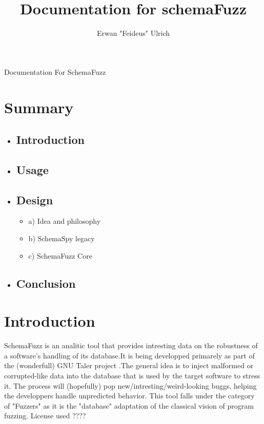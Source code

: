 \documentclass{article}
\title{Documentation for schemaFuzz}
\author{Erwan "Feideus" Ulrich}
\begin{document}
\maketitle Documentation For SchemaFuzz

	\section{Summary}	
		\begin{itemize}	
		\item \subsection*{Introduction} 
		\item \subsection*{Usage}
		\item \subsection*{Design}
		\begin{itemize}	
			\item a) Idea and philosophy
			\item b) SchemaSpy legacy
			\item c) SchemaFuzz Core
		\end{itemize}
		\item \subsection*{Conclusion}
			
		\end{itemize}
				
	\section{Introduction}
	
SchemaFuzz is an analitic tool that provides intresting data on the robustness of a 			software's handling of its database.It is being developped primarely as part of the (wonderfull) GNU Taler project .The general idea is to inject malformed or corrupted-like data into the database that is used by the target software to stress it. The process will (hopefully) pop new/intresting/weird-looking buggs, helping the developpers handle unpredicted behavior.
This tool falls under the category of "Fuzzers" as it is the "database" adaptation of the classical vision of program fuzzing. License used ????
		
\end{document}
